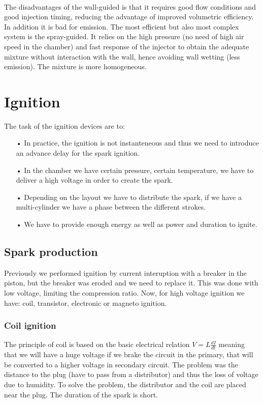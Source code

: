 	\ \\
	The disadvantages of the wall-guided is that it requires good flow conditions and good injection timing, reducing the advantage of improved volumetric efficiency. In addition it is bad for emission. The most efficient but also most complex system is the spray-guided. It relies on the high pressure (no need of high air speed in the chamber) and fast response of the injector to obtain the adequate mixture without interaction with the wall, hence avoiding wall wetting (less emission).  The mixture is more homogeneous. 
	
\section{Ignition}
	The task of the ignition devices are to: 
	\begin{itemize}
	\item[•] In practice, the ignition is not instanteneous and thus we need to introduce an advance delay for the spark ignition. 

 	\item[•] 	In the chamber we have certain pressure, certain temperature, we have to deliver a high voltage in order to create the spark. 

	\item[•]	Depending on the layout we have to distribute the spark, if we have a multi-cylinder we have a phase between the different strokes. 
	
	\item[•] We have to provide enough energy as well as power and duration to ignite.  \\
	\end{itemize}

\subsection{Spark production}	
	Previously we performed ignition by current interuption with a breaker in the piston, but the breaker was eroded and we need to replace it. This was done with low voltage, limiting the compression ratio. Now, for high voltage ignition we have: coil, transistor, electronic or magneto ignition. 

\subsubsection{Coil ignition}
	The principle of coil is based on the basic electrical relation $V = L\frac{dI}{dt}$ meaning that we will have a huge voltage if we brake the circuit in the primary, that will be converted to a higher voltage in secondary circuit. The problem was the distance to the plug (have to pass from a distributor) and thus the loss of voltage due to humidity. To solve the problem, the distributor and the coil are placed near the plug. The duration of the spark is short. 
	
